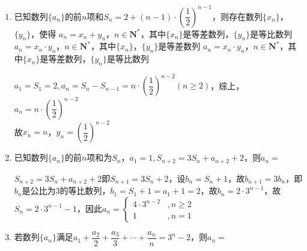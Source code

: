 \begin{enumerate}
\begin{enumerate}
        \item 已知数列$\{a_n\}$的前$n$项和$S_n = 2 + (n-1)\cdot \left ( \dfrac{1}{2} \right )^{n-1}$，则存在数列$\{x_n\}$，$\{y_n\}$，使得
        {$a_n = x_n + y_n$，$n \in \mathbf{N^*}$，其中$\{x_n\}$是等差数列，$\{y_n\}$是等比数列}
        {$a_n = x_n \cdot y_n$，$n \in \mathbf{N^*}$，其中$\{x_n\}$，$\{y_n\}$是等差数列}
        {$a_n = x_n \cdot y_n$，$n \in \mathbf{N^*}$，其中$\{x_n\}$是等差数列，$\{y_n\}$是等比数列}
        \begin{jieda}
            $a_1 = S_1 = 2, a_n = S_n - S_{n-1} = n \cdot \left ( \dfrac{1}{2} \right )^{n-2} (n \geq 2)$，综上，$a_n = n \cdot \left ( \dfrac{1}{2} \right )^{n-2}$\\
            故$x_n = n$，$y_n = \left ( \dfrac{1}{2} \right )^{n-2}$
        \end{jieda}
        \item 已知数列$\{a_n\}$的前$n$项和为$S_n$，$a_1 = 1, S_{n+2} = 3S_n + a_{n+2} + 2$，则$a_n = $
    \begin{jieda}
        $S_{n+2} = 3S_n + a_{n+2} + 2$即$S_{n+1} = 3S_n + 2$，设$b_n = S_n + 1$，故$b_{n+1} = 3b_n$，即$b_n$是公比为3的等比数列，$b_1 = S_1 + 1 = a_1 + 1 = 2$，故$b_n = 2 \cdot 3^{n-1}$，故$S_n = 2 \cdot 3^{n-1} - 1$，因此$a_n = \left \{\begin{array}{ll}
             4 \cdot 3^{n-2} & ,n \geq 2  \\
             1 & ,n = 1
        \end{array} \right .$
    \end{jieda}
    \item 若数列$\{a_n\}$满足$a_1 + \dfrac{a_2}{2} + \dfrac{a_3}{3} + \cdots + \dfrac{a_n}{n} = 3^n - 2$，则$a_n = $
\end{enumerate}
\end{enumerate}
